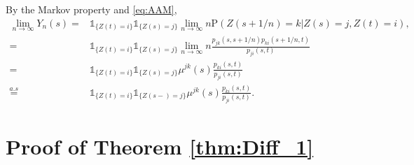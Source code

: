\documentclass[12pt]{article}
\newcommand{\indic}[1]{\mathds{1}_{ \{ #1 \} }}
\renewcommand{\P}{\text{P}}
\theoremstyle{my_thm}
\begin{document}
By the Markov property and \eqref{eq:AAM},
\begin{align*}
\lim_{n\rightarrow \infty} Y_n(s) =& \indic{Z(t)=i} \indic{Z(s)=j} \lim_{n\rightarrow \infty} n \P \left. \left( Z(s+1/n)=k \right| Z(s)=j, Z(t)=i \right),
\\
=&\indic{Z(t)=i} \indic{Z(s)=j} \lim_{n\rightarrow \infty} n \frac{p_{jk}(s,s+1/n)p_{ki}(s+1/n,t)}{p_{ji}(s,t)}
\\
=&\indic{Z(t)=i} \indic{Z(s)=j} \mu^{jk}(s) \frac{p_{ki}(s,t)}{p_{ji}(s,t)}
\\
\overset{a.s}{=}
&\indic{Z(t)=i} \indic{Z(s-)=j} \mu^{jk}(s) \frac{p_{ki}(s,t)}{p_{ji}(s,t)}.
\end{align*}




\section{Proof of Theorem \ref{thm:Diff_1} }
\end{document}
